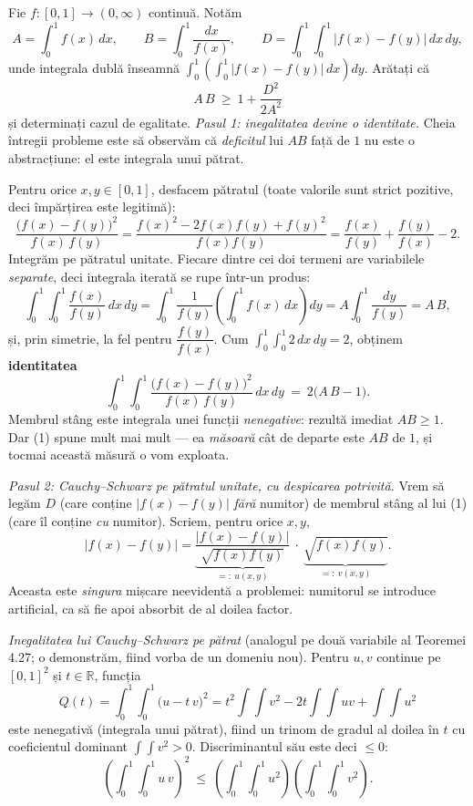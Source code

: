 Fie $f:[0,1]\to(0,\infty)$ continuă. Notăm
\[ A=\int_{0}^{1}f(x)\,dx,\qquad B=\int_{0}^{1}\frac{dx}{f(x)},\qquad D=\int_{0}^{1}\!\!\int_{0}^{1}\bigl|f(x)-f(y)\bigr|\,dx\,dy , \]
unde integrala dublă înseamnă $\displaystyle\int_{0}^{1}\left(\int_{0}^{1}\bigl|f(x)-f(y)\bigr|\,dx\right)dy$. Arătați că
\[ A\,B\ \ge\ 1+\frac{D^{2}}{2A^{2}} \]
și determinați cazul de egalitate.
\sol \emph{Pasul 1: inegalitatea devine o identitate.} Cheia întregii probleme este să observăm că \emph{deficitul} lui $AB$ față de $1$ nu este o abstracțiune: el este integrala unui pătrat.

Pentru orice $x,y\in[0,1]$, desfacem pătratul (toate valorile sunt strict pozitive, deci împărțirea este legitimă):
\[ \frac{\bigl(f(x)-f(y)\bigr)^{2}}{f(x)\,f(y)}=\frac{f(x)^{2}-2f(x)f(y)+f(y)^{2}}{f(x)f(y)}=\frac{f(x)}{f(y)}+\frac{f(y)}{f(x)}-2 . \]
Integrăm pe pătratul unitate. Fiecare dintre cei doi termeni are variabilele \emph{separate}, deci integrala iterată se rupe într-un produs:
\[ \int_{0}^{1}\!\!\int_{0}^{1}\frac{f(x)}{f(y)}\,dx\,dy=\int_{0}^{1}\frac{1}{f(y)}\left(\int_{0}^{1}f(x)\,dx\right)dy=A\int_{0}^{1}\frac{dy}{f(y)}=A\,B , \]
și, prin simetrie, la fel pentru $\dfrac{f(y)}{f(x)}$. Cum $\int_{0}^{1}\!\int_{0}^{1}2\,dx\,dy=2$, obținem \textbf{identitatea}
\[ \int_{0}^{1}\!\!\int_{0}^{1}\frac{\bigl(f(x)-f(y)\bigr)^{2}}{f(x)\,f(y)}\,dx\,dy\ =\ 2\bigl(A\,B-1\bigr) . \tag{1} \]
Membrul stâng este integrala unei funcții \emph{nenegative}: rezultă imediat $AB\ge1$. Dar (1) spune mult mai mult --- ea \emph{măsoară} cât de departe este $AB$ de $1$, și tocmai această măsură o vom exploata.

\emph{Pasul 2: Cauchy--Schwarz pe pătratul unitate, cu despicarea potrivită.} Vrem să legăm $D$ (care conține $|f(x)-f(y)|$ \emph{fără} numitor) de membrul stâng al lui (1) (care îl conține \emph{cu} numitor). Scriem, pentru orice $x,y$,
\[ \bigl|f(x)-f(y)\bigr|=\underbrace{\frac{\bigl|f(x)-f(y)\bigr|}{\sqrt{f(x)f(y)}}}_{=:\ u(x,y)}\ \cdot\ \underbrace{\sqrt{f(x)f(y)}}_{=:\ v(x,y)} . \]
Aceasta este \emph{singura} mișcare neevidentă a problemei: numitorul se introduce artificial, ca să fie apoi absorbit de al doilea factor.

\emph{Inegalitatea lui Cauchy--Schwarz pe pătrat} (analogul pe două variabile al Teoremei 4.27; o demonstrăm, fiind vorba de un domeniu nou). Pentru $u,v$ continue pe $[0,1]^{2}$ și $t\in\mathbb{R}$, funcția
\[ Q(t)=\int_{0}^{1}\!\!\int_{0}^{1}\bigl(u-t\,v\bigr)^{2}=t^{2}\!\int\!\!\int v^{2}-2t\!\int\!\!\int uv+\int\!\!\int u^{2} \]
este nenegativă (integrala unui pătrat), fiind un trinom de gradul al doilea în $t$ cu coeficientul dominant $\int\!\int v^{2}>0$. Discriminantul său este deci $\le0$:
\[ \left(\int_{0}^{1}\!\!\int_{0}^{1}u\,v\right)^{2}\ \le\ \left(\int_{0}^{1}\!\!\int_{0}^{1}u^{2}\right)\left(\int_{0}^{1}\!\!\int_{0}^{1}v^{2}\right) . \tag{2} \]

